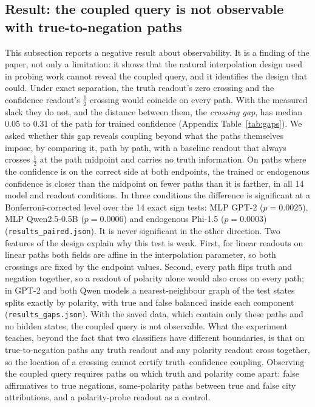 \documentclass[10pt]{article}
\theoremstyle{definition}
\theoremstyle{remark}
\begin{document}
\subsection{Result: the coupled query is not observable with true-to-negation paths}
\label{sec:observe}
\label{sec:confound}

This subsection reports a negative result about observability. It is a
finding of the paper, not only a limitation: it shows that the natural
interpolation design used in probing work cannot reveal the coupled query,
and it identifies the design that could. Under exact separation, the
truth readout's zero crossing and the confidence readout's $\tfrac12$
crossing would coincide on every path.
With the measured slack they do not, and the distance between them, the
\emph{crossing gap}, has median 0.05 to 0.31 of the path for trained
confidence (Appendix Table~\ref{tab:gaps}). We asked whether this gap
reveals coupling beyond what the paths themselves impose, by comparing it,
path by path, with a baseline readout that always crosses $\tfrac12$ at
the path midpoint and carries no truth information. On paths where the
confidence is on the correct side at both endpoints, the trained or
endogenous confidence is closer than the midpoint on fewer paths than it
is farther, in all 14 model and readout conditions. In three conditions
the difference is significant at a Bonferroni-corrected level over the
14 exact sign tests: MLP GPT-2 ($p=0.0025$), MLP Qwen2.5-0.5B
($p=0.0006$) and endogenous Phi-1.5 ($p=0.0003$)
(\texttt{results\_paired.json}). It is never significant in the other
direction. Two features of the design explain why this test is weak.
First, for linear readouts on linear paths both fields are affine in the
interpolation parameter, so both crossings are fixed by the endpoint
values. Second, every path flips truth and negation together, so a readout
of polarity alone would also cross on every path; in GPT-2 and both Qwen
models a nearest-neighbour graph of the test states splits exactly by
polarity, with true and false balanced inside each component
(\texttt{results\_gaps.json}). With the saved data, which contain only
these paths and no hidden states, the coupled query is not observable.
What the experiment teaches, beyond the fact that two classifiers have
different boundaries, is that on true-to-negation paths any truth readout
and any polarity readout cross together, so the location of a crossing
cannot certify truth--confidence coupling. Observing the coupled query
requires paths on which truth and polarity come apart: false affirmatives
to true negations, same-polarity paths between true and false city
attributions, and a polarity-probe readout as a control.
\end{document}
